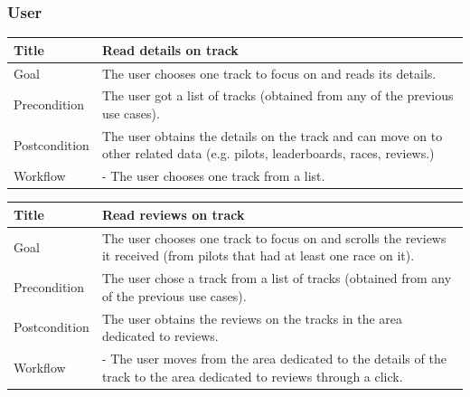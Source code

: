 \documentclass{beamer}
\begin{document}
\begin{frame}
    \frametitle{User}
    \begin{table}
        \tiny
        \begin{tabular}{|p{2cm}|p{6cm}|}
        \hline
        Title & \textbf{Read details on track} \\
        \hline
        Goal & The user chooses one track to focus on and reads its details. \\
        \hline
        Precondition & The user got a list of tracks (obtained from any of the previous use cases).\\
        \hline
        Postcondition & The user obtains the details on the track and can move on to other related data (e.g. pilots, leaderboards, races, reviews.) \\
        \hline
        Workflow &
        - The user chooses one track from a list. \\
        \hline
        \end{tabular}
\end{table}

\begin{table}
    \tiny
    \begin{tabular}{|p{2cm}|p{6cm}|}
    \hline
    Title & \textbf{Read reviews on track} \\
    \hline
    Goal & The user chooses one track to focus on and scrolls the reviews it received (from pilots
    that had at least one race on it). \\
    \hline
    Precondition & The user chose a track from a list of tracks (obtained from any of the previous use cases).\\
    \hline
    Postcondition & The user obtains the reviews on the tracks in the area dedicated to reviews. \\
    \hline
    Workflow &
    - The user moves from the area dedicated to the details of the track to the
    area dedicated to reviews through a click. \\
    \hline
    \end{tabular}
\end{table}
\end{frame}


\end{document}
